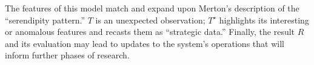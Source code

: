 The features of this model match and expand upon Merton's
\citeyear{merton1948bearing} description of the ``serendipity
pattern.'' $T$ is an unexpected observation; $T^\star$ highlights its
interesting or anomalous features and recasts them as ``strategic
data.''  Finally, the result $R$ and its evaluation may lead to
updates to the system's operations that will inform further phases of
research.
